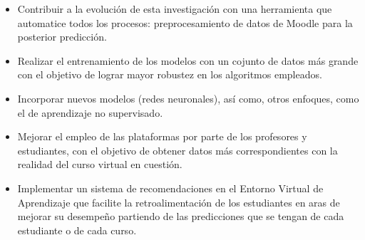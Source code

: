 \begin{recomendations}
    \begin{itemize}
        \item Contribuir a la evolución de esta investigación con una herramienta que automatice todos los procesos: preprocesamiento de datos de Moodle para la posterior predicción. 
        \item Realizar el entrenamiento de los modelos con un cojunto de datos más grande con el objetivo de lograr mayor robustez en los algoritmos empleados. 
        \item Incorporar nuevos modelos (redes neuronales), así como, otros enfoques, como el de aprendizaje no supervisado.
        \item Mejorar el empleo de las plataformas por parte de los profesores y estudiantes, con el objetivo de obtener datos más correspondientes con la realidad del curso virtual en cuestión.
        \item Implementar un sistema de recomendaciones en el Entorno Virtual de Aprendizaje que facilite la retroalimentación de los estudiantes en aras de mejorar su desempeño partiendo de las predicciones que se tengan de cada estudiante o de cada curso.
    \end{itemize}


\end{recomendations}
